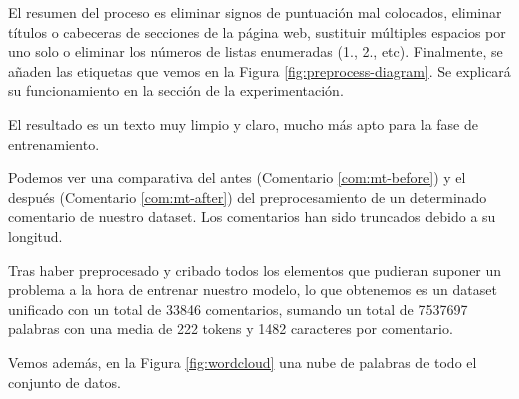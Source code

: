 El resumen del proceso es eliminar signos de puntuación mal colocados, eliminar títulos o cabeceras de secciones de la página web, sustituir múltiples espacios por uno solo o eliminar los números de listas enumeradas (1., 2., etc). Finalmente, se añaden las etiquetas que vemos en la Figura \ref{fig:preprocess-diagram}. Se explicará su funcionamiento en la sección de la experimentación.

El resultado es un texto muy limpio y claro, mucho más apto para la fase de entrenamiento.

Podemos ver una comparativa del antes (Comentario \ref{com:mt-before}) y el después (Comentario \ref{com:mt-after}) del preprocesamiento de un determinado comentario de nuestro dataset. Los comentarios han sido truncados debido a su longitud.


\begin{thm}
	\label{com:mt-before}
\end{thm}


\begin{thm}
	\label{com:mt-after}
\end{thm}


Tras haber preprocesado y cribado todos los elementos que pudieran suponer un problema a la hora de entrenar nuestro modelo, lo que obtenemos es un dataset unificado con un total de 33846 comentarios, sumando un total de 7537697 palabras con una media de 222 tokens y 1482 caracteres por comentario. 


Vemos además, en la Figura \ref{fig:wordcloud} una nube de palabras de todo el conjunto de datos. 


